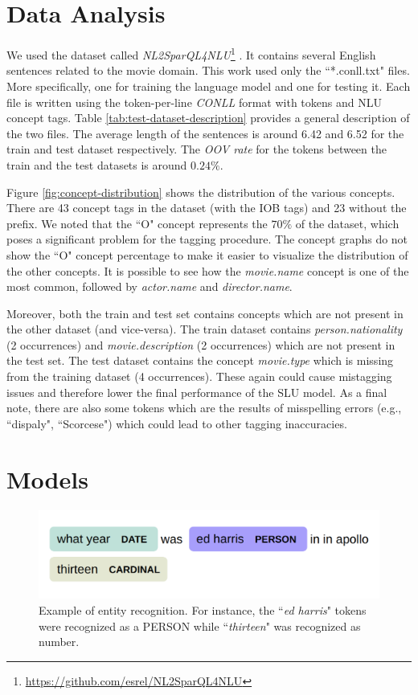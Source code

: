 \documentclass[11pt,a4paper]{article}
\begin{document}
\section{Data Analysis}

We used the dataset called \textit{NL2SparQL4NLU}\footnote{\url{https://github.com/esrel/NL2SparQL4NLU}} \citep{Chen2014DerivingLR, gobbi2018concept}. It contains several English sentences related to the movie domain. This work used only the ``*.conll.txt" files. More specifically, one for training the language model and one for testing it. Each file is written using the token-per-line \textit{CONLL} format with tokens and NLU concept tags. Table \ref{tab:test-dataset-description} provides a general description of the two files. The average length of the sentences is around 6.42 and 6.52 for the train and test dataset respectively. The \textit{OOV rate} for the tokens between the train and the test datasets is around $0.24\%$.


Figure \ref{fig:concept-distribution} shows the distribution of the various concepts. There are 43 concept tags in the dataset (with the IOB tags) and 23 without the prefix. We noted that the ``O" concept represents the $70\%$ of the dataset, which poses a significant problem for the tagging procedure. The concept graphs do not show the ``O" concept percentage to make it easier to visualize the distribution of the other concepts. It is possible to see how the \textit{movie.name} concept is one of the most common, followed by \textit{actor.name} and \textit{director.name}.


Moreover, both the train and test set contains concepts which are not present in the other dataset (and vice-versa). The train dataset contains \textit{person.nationality} (2 occurrences) and \textit{movie.description} (2 occurrences) which are not present in the test set. The test dataset contains the concept \textit{movie.type} which is missing from the training dataset (4 occurrences). These again could cause mistagging issues and therefore lower the final performance of the SLU model. 
As a final note, there are also
some tokens which are the results of misspelling errors (e.g., ``dispaly", ``Scorcese") which could lead to other tagging inaccuracies.



\section{Models}

\begin{figure}[b!]
\centering
	\includegraphics[width=1\linewidth]{img/entity}
	\caption{Example of entity recognition. For instance, the ``\textit{ed harris}" tokens were recognized as a PERSON while ``\textit{thirteen}" was recognized as number.}
	\label{fig:entity-recognition}
\end{figure}
\end{document}
